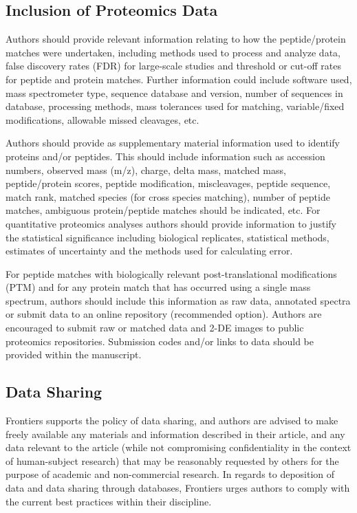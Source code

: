 \documentclass{frontiersSCNS} %
\begin{document}
\subsection{Inclusion of Proteomics Data}

Authors should provide relevant information relating to how the peptide/protein matches were undertaken, including methods used to process and analyze data, false discovery rates (FDR) for large-scale studies and threshold or cut-off rates for peptide and protein matches. Further information could include software used, mass spectrometer type, sequence database and version, number of sequences in database, processing methods, mass tolerances used for matching, variable/fixed modifications, allowable missed cleavages, etc.

Authors should provide as supplementary material information used to identify proteins and/or peptides. This should include information such as accession numbers, observed mass (m/z), charge, delta mass, matched mass, peptide/protein scores, peptide modification, miscleavages, peptide sequence, match rank, matched species (for cross species matching), number of peptide matches, ambiguous protein/peptide matches should be indicated, etc.
For quantitative proteomics analyses authors should provide information to justify the statistical significance including biological replicates, statistical methods, estimates of uncertainty and the methods used for calculating error.

For peptide matches with biologically relevant post-translational modifications (PTM) and for any protein match that has occurred using a single mass spectrum, authors should include this information as raw data, annotated spectra or submit data to an online repository (recommended option).
Authors are encouraged to submit raw or matched data and 2-DE images to public proteomics repositories. Submission codes and/or links to data should be provided within the manuscript.

\subsection{Data Sharing}

Frontiers supports the policy of data sharing, and authors are advised to make freely available any materials and information described in their article, and any data relevant to the article (while not compromising confidentiality in the context of human-subject research) that may be reasonably requested by others for the purpose of academic and non-commercial research. In regards to deposition of data and data sharing through databases, Frontiers urges authors to comply with the current best practices within their discipline.
\end{document}
